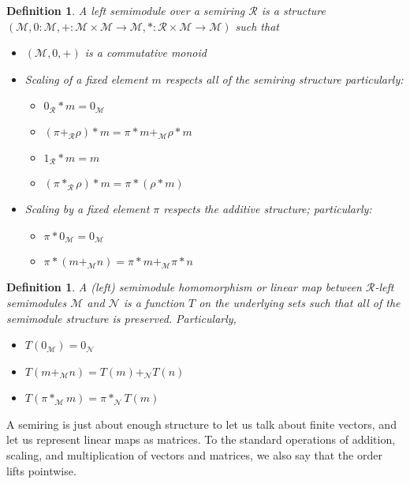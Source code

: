 \documentclass[submission,copyright,creativecommons]{eptcs}
\newtheorem{definition}[theorem]{Definition}
\begin{document}
\begin{definition}
  A \emph{left semimodule} over a semiring $\mathscr R$ is a structure
  $(\mathscr M, 0 : \mathscr M, + : \mathscr M \times \mathscr M \to \mathscr M,
  * : \mathscr R \times \mathscr M \to \mathscr M)$ such that
  \begin{itemize}
  \item $(\mathscr M, 0, +)$ is a commutative monoid
  \item Scaling of a fixed element $m$ respects all of the semiring structure
    particularly:
    \begin{itemize}
    \item $0_\mathscr R * m = 0_\mathscr M$
    \item $(\pi +_\mathscr R \rho) * m = \pi * m +_\mathscr M \rho * m$
    \item $1_\mathscr R * m = m$
    \item $(\pi *_\mathscr R \rho) * m = \pi * (\rho * m)$
    \end{itemize}
  \item Scaling by a fixed element $\pi$ respects the additive structure;
    particularly:
    \begin{itemize}
    \item $\pi * 0_\mathscr M = 0_\mathscr M$
    \item $\pi * (m +_\mathscr M n) = \pi * m +_\mathscr M \pi * n$
    \end{itemize}
  \end{itemize}
\end{definition}

\begin{definition}
  A \emph{(left) semimodule homomorphism} or \emph{linear map} between
  $\mathscr R$-left semimodules $\mathscr M$ and $\mathscr N$ is a function $T$
  on the underlying sets such that all of the semimodule structure is preserved.
  Particularly,
  \begin{itemize}
  \item $T(0_\mathscr M) = 0_\mathscr N$
  \item $T(m +_\mathscr M n) = T(m) +_\mathscr N T(n)$
  \item $T(\pi *_\mathscr M m) = \pi *_\mathscr N T(m)$
  \end{itemize}
\end{definition}

A semiring is just about enough structure to let us talk about finite vectors,
and let us represent linear maps as matrices.
To the standard operations of addition, scaling, and multiplication of vectors
and matrices, we also say that the order lifts pointwise.
\end{document}
